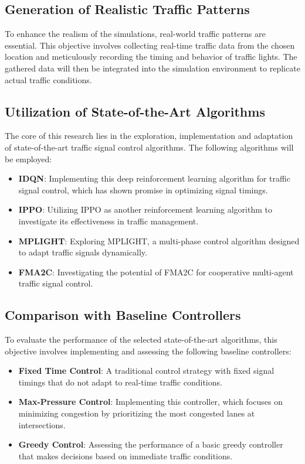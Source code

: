 \subsection{Generation of Realistic Traffic Patterns}
To enhance the realism of the simulations, real-world traffic patterns are essential. This objective involves collecting real-time traffic data from the chosen location and meticulously recording the timing and behavior of traffic lights. The gathered data will then be integrated into the simulation environment to replicate actual traffic conditions.

\subsection{Utilization of State-of-the-Art Algorithms}
The core of this research lies in the exploration, implementation and adaptation of state-of-the-art traffic signal control algorithms. The following algorithms will be employed:

\begin{itemize}
  \item \textbf{IDQN}: Implementing this deep reinforcement learning algorithm for traffic signal control, which has shown promise in optimizing signal timings.
  
  \item \textbf{IPPO}: Utilizing IPPO as another reinforcement learning algorithm to investigate its effectiveness in traffic management.
  
  \item \textbf{MPLIGHT}: Exploring MPLIGHT, a multi-phase control algorithm designed to adapt traffic signals dynamically.
  
  \item \textbf{FMA2C}: Investigating the potential of FMA2C for cooperative multi-agent traffic signal control.
\end{itemize}

\subsection{Comparison with Baseline Controllers}
To evaluate the performance of the selected state-of-the-art algorithms, this objective involves implementing and assessing the following baseline controllers:

\begin{itemize}
  \item \textbf{Fixed Time Control}: A traditional control strategy with fixed signal timings that do not adapt to real-time traffic conditions.
  
  \item \textbf{Max-Pressure Control}: Implementing this controller, which focuses on minimizing congestion by prioritizing the most congested lanes at intersections.
  
  \item \textbf{Greedy Control}: Assessing the performance of a basic greedy controller that makes decisions based on immediate traffic conditions.
\end{itemize}

